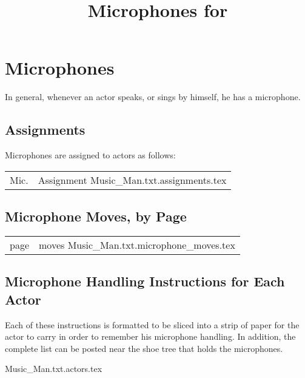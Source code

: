 \documentclass[letterpaper]{article}
\title{Microphones for {\ParameterShowName}}
\author{\ParameterDesigner}
\date{\ParameterDateNumeric}
\begin{document}
\maketitle
\tableofcontents
\newpage

\section {Microphones}
In general, whenever an actor speaks, or sings by himself, he has a microphone.

\subsection {Assignments}
Microphones are assigned to actors as follows:

\begin{center}
\begin{longtable}{|l|m{7in}|}
\hline Mic. & Assignment \endhead \hline
 {Music_Man.txt.assignments.tex}
\end{longtable}
\end{center}

\subsection {Microphone Moves, by Page}

\begin{center}
\begin{longtable}{|l|m{7in}|}
\hline page & moves \endhead \hline
 {Music_Man.txt.microphone_moves.tex}
\end{longtable}
\end{center}

\subsection {Microphone Handling Instructions for Each Actor}

Each of these instructions is formatted to be sliced into a strip of paper
for the actor to carry in order to remember his microphone handling.
In addition, the complete list can be posted near the shoe tree that
holds the microphones.

\vskip 0.25in
{\setlength{\parindent}{0in}
 {Music_Man.txt.actors.tex}
}
\end{document}
